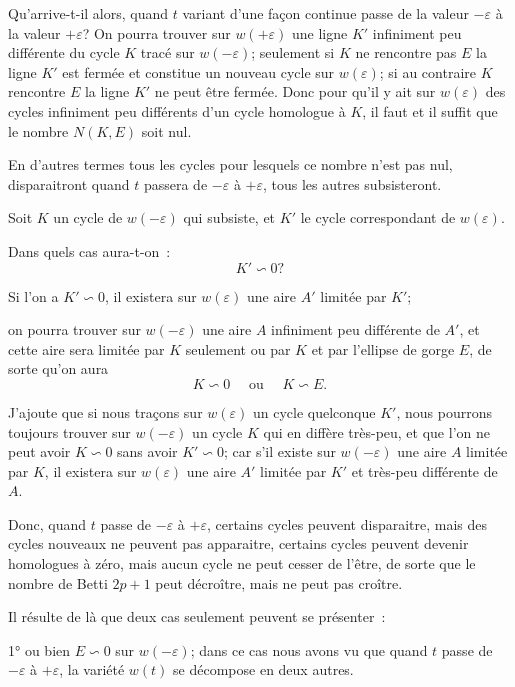 \documentclass{article}
\begin{document}
Qu'arrive-t-il alors, quand $t$ variant d'une façon continue passe de la valeur $-\varepsilon$ à la valeur $+\varepsilon$? On pourra trouver sur $w(+\varepsilon)$ une ligne $K'$ infiniment peu différente du cycle $K$ tracé sur $w(-\varepsilon)$; seulement si $K$ ne rencontre pas $E$ la ligne $K'$ est fermée et constitue un nouveau cycle sur $w(\varepsilon)$; si au contraire $K$ rencontre $E$ la ligne $K'$ ne peut être fermée. Donc pour qu'il y ait sur $w(\varepsilon)$ des cycles infiniment peu différents d'un cycle homologue à $K$, il faut et il suffit que le nombre $N(K, E)$ soit nul.

En d'autres termes tous les cycles pour lesquels ce nombre n'est pas nul, disparaitront quand $t$ passera de $-\varepsilon$ à $+\varepsilon$, tous les autres subsisteront.

Soit $K$ un cycle de $w(-\varepsilon)$ qui subsiste, et $K'$ le cycle correspondant de $w(\varepsilon)$.

Dans quels cas aura-t-on~:
\[ K' \backsim 0? \]

Si l'on a $K' \backsim 0$, il existera sur $w(\varepsilon)$ une aire $A'$ limitée par $K'$;

on pourra trouver sur $w(-\varepsilon)$ une aire $A$ infiniment peu différente de $A'$, et cette aire sera limitée par $K$ seulement ou par $K$ et par l'ellipse de gorge $E$, de sorte qu'on aura
\[ K \backsim 0 \quad \text{ ou } \quad K \backsim E. \]

J'ajoute que si nous traçons sur $w(\varepsilon)$ un cycle quelconque $K'$, nous pourrons toujours trouver sur $w(-\varepsilon)$ un cycle $K$ qui en diffère très-peu, et que l'on ne peut avoir $K \backsim 0$ sans avoir $K' \backsim 0$; car s'il existe sur $w(-\varepsilon)$ une aire $A$ limitée par $K$, il existera sur $w(\varepsilon)$ une aire $A'$ limitée par $K'$ et très-peu différente de $A$.

Donc, quand $t$ passe de $-\varepsilon$ à $+\varepsilon$, certains cycles peuvent disparaitre, mais des cycles nouveaux ne peuvent pas apparaitre, certains cycles peuvent devenir homologues à zéro, mais aucun cycle ne peut cesser de l'être, de sorte que le nombre de Betti $2p + 1$ peut décroître, mais ne peut pas croître.

Il résulte de là que deux cas seulement peuvent se présenter~:

1° ou bien $E \backsim 0$ sur $w(-\varepsilon)$; dans ce cas nous avons vu que quand $t$ passe de $-\varepsilon$ à $+\varepsilon$, la variété $w(t)$ se décompose en deux autres.
\end{document}
